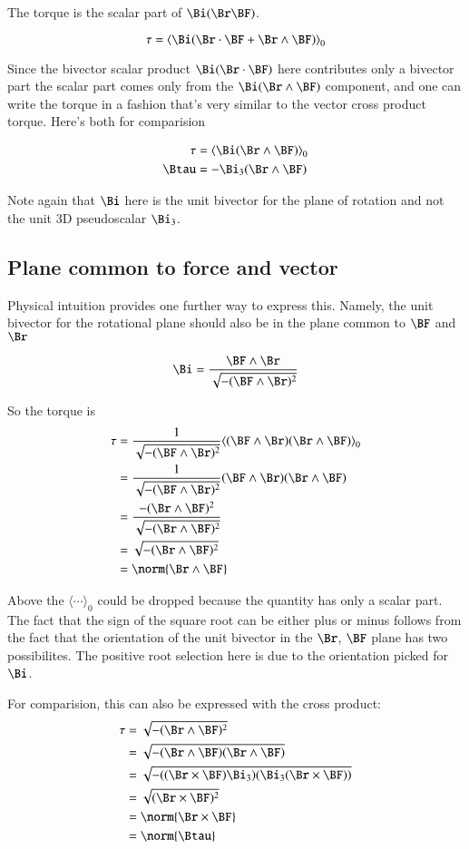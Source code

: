 \documentclass{article}      %
\newcommand{\bithree}[0]{{\Bi}_3}
\begin{document}
The torque is the scalar part of $\Bi (\Br \BF)$.

\[
\tau 
   =  {\langle \Bi (\Br \cdot \BF + \Br \wedge \BF) \rangle}_0 \\
\]

Since the bivector scalar product $\Bi (\Br \cdot \BF)$ here contributes only a bivector part the scalar part comes only from the $\Bi (\Br \wedge \BF)$ component,
and one can write the torque in a fashion that's very similar to the vector cross product torque.  Here's both for comparision

\begin{align*}
\tau &=  {\langle \Bi (\Br \wedge \BF) \rangle}_0 \\
\Btau &= -\bithree (\Br \wedge \BF)
\end{align*}

Note again that $\Bi$ here is the unit bivector for the plane of rotation and not the unit 3D pseudoscalar $\bithree$.

\subsection{Plane common to force and vector}
Physical intuition provides one further way to express this.  Namely, the unit bivector for the rotational plane should also be in the plane common to $\BF$ and $\Br$

\[
\Bi = \frac{\BF \wedge \Br}{\sqrt{-(\BF \wedge \Br)^2}}
\]

So the torque is
\begin{align*}
\tau 
   &=  \frac{1}{\sqrt{-(\BF \wedge \Br)^2}} {\langle (\BF \wedge \Br)(\Br \wedge \BF) \rangle}_0 \\
   &=  \frac{1}{\sqrt{-(\BF \wedge \Br)^2}} {(\BF \wedge \Br)(\Br \wedge \BF) } \\
   &=  \frac {-(\Br \wedge \BF)^2 } {\sqrt{-(\Br \wedge \BF)^2}} \\
   &=  \sqrt {-(\Br \wedge \BF)^2 } \\
   &=  \norm {\Br \wedge \BF}
\end{align*}

Above the ${\langle \cdots \rangle}_0$ could be dropped because the quantity has only a scalar part.
The fact that the sign of the square root can be either plus or minus follows from the fact that the orientation of the unit bivector in the $\Br$, $\BF$ plane has two possibilites.  The positive root selection here is due to the orientation picked for $\Bi$.  

For comparision, this can also be expressed with the cross product:
\begin{align*}
\tau 
   &=  \sqrt {-(\Br \wedge \BF)^2 } \\
   &=  \sqrt {-(\Br \wedge \BF)(\Br \wedge \BF) } \\
   &=  \sqrt {-((\Br \times \BF)\bithree)(\bithree(\Br \times \BF)) } \\
   &=  \sqrt {(\Br \times \BF)^2} \\
   &=  \norm{\Br \times \BF} \\
   &=  \norm{\Btau} \\
\end{align*}
\end{document}

